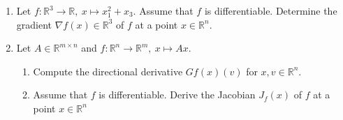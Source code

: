 \vspace*{-0.5cm}
\begin{enumerate}
\item Let $f : \mathbb{R}^{3} \to \mathbb{R},~ x \mapsto x^2_1 + x_3$. Assume that $f$ is differentiable. Determine the gradient $\nabla f(x) \in \mathbb{R}^3$ of $f$ at a point $x \in\mathbb{R}^{n}$.
	\item Let $A\in \mathbb{R}^{m \times n}$ and $f : \mathbb{R}^{n} \to \mathbb{R}^m, ~x \mapsto Ax $.
	\begin{enumerate}
		\item Compute the directional derivative $Gf(x)(v)$ for $x,v\in\mathbb{R}^n$.
		\item Assume that $f$ is differentiable. Derive the Jacobian $J_f(x)$ of $f$ at a point $x \in\mathbb{R}^{n}$
	\end{enumerate} 
	
	
\end{enumerate}
 